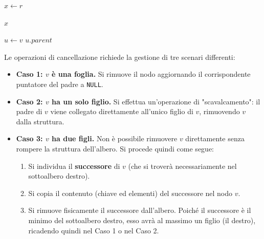 \begin{algorithm}[H]
    \caption{Ricerca del minimo in un BST}
    \label{alg:findmin_bst}
    \SetAlgoLined
    \DontPrintSemicolon
    
    
    \BlankLine 
    
    
    $x \leftarrow r$\;
    
    \Return $x$\;
\end{algorithm}



\begin{algorithm}[H]
    \caption{Ricerca del successore di un nodo in un BST}
    \label{alg:findSuccessor_bst}
    \SetAlgoLined
    \DontPrintSemicolon
    
    
    \BlankLine 
    
    
    $u \leftarrow v$\;
    \Return $u.parent$\;
\end{algorithm}


Le operazioni di cancellazione richiede la gestione di tre scenari differenti:

\begin{itemize}
    \item \textbf{Caso 1: $v$ è una foglia.} Si rimuove il nodo aggiornando il corrispondente puntatore del padre a \texttt{NULL}.
    \item \textbf{Caso 2: $v$ ha un solo figlio.} Si effettua un'operazione di "scavalcamento": il padre di $v$ viene collegato direttamente all'unico figlio di $v$, rimuovendo $v$ dalla struttura.
    \item \textbf{Caso 3: $v$ ha due figli.} Non è possibile rimuovere $v$ direttamente senza rompere la struttura dell'albero. Si procede quindi come segue:
    \begin{enumerate}
        \item Si individua il \textbf{successore} di $v$ (che si troverà necessariamente nel sottoalbero destro).
        \item Si copia il contenuto (chiave ed elementi) del successore nel nodo $v$.
        \item Si rimuove fisicamente il successore dall'albero. Poiché il successore è il minimo del sottoalbero destro, esso avrà al massimo un figlio (il destro), ricadendo quindi nel Caso 1 o nel Caso 2.
    \end{enumerate}
\end{itemize}

